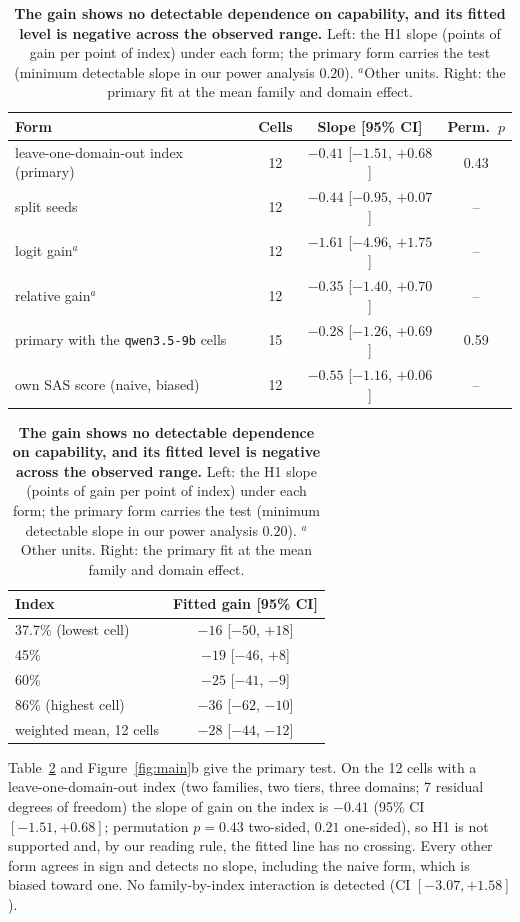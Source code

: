 \begin{table}[t]
\caption{\textbf{The gain shows no detectable dependence on capability, and its fitted level is negative across the observed range.} Left: the H1 slope (points of gain per point of index) under each form; the primary form carries the test (minimum detectable slope in our power analysis $0.20$). $^{a}$Other units. Right: the primary fit at the mean family and domain effect.}
\label{tab:h1}
\begin{center}
\scriptsize
\setlength{\tabcolsep}{4pt}
\begin{minipage}[t]{0.60\linewidth}
\centering
\setlength{\tabcolsep}{3pt}
\begin{tabular}{@{}lccc@{}}
\toprule
Form & Cells & Slope [95\% CI] & Perm.\ $p$ \\
\midrule
leave-one-domain-out index (primary) & 12 & $-0.41$ [$-1.51$, $+0.68$] & 0.43 \\
split seeds & 12 & $-0.44$ [$-0.95$, $+0.07$] & -- \\
logit gain$^{a}$ & 12 & $-1.61$ [$-4.96$, $+1.75$] & -- \\
relative gain$^{a}$ & 12 & $-0.35$ [$-1.40$, $+0.70$] & -- \\
primary with the \texttt{qwen3.5-9b} cells & 15 & $-0.28$ [$-1.26$, $+0.69$] & 0.59 \\
own SAS score (naive, biased) & 12 & $-0.55$ [$-1.16$, $+0.06$] & -- \\
\bottomrule
\end{tabular}
\end{minipage}\hfill
\begin{minipage}[t]{0.37\linewidth}
\centering
\begin{tabular}{@{}lc@{}}
\toprule
Index & Fitted gain [95\% CI] \\
\midrule
37.7\% (lowest cell) & $-16$ [$-50$, $+18$] \\
45\% & $-19$ [$-46$, $+8$] \\
60\% & $-25$ [$-41$, $-9$] \\
86\% (highest cell) & $-36$ [$-62$, $-10$] \\
\midrule
weighted mean, 12 cells & $-28$ [$-44$, $-12$] \\
\bottomrule
\end{tabular}
\end{minipage}
\end{center}
\end{table}

Table~\ref{tab:h1} and Figure~\ref{fig:main}b give the primary test. On the 12 cells with a leave-one-domain-out index (two families, two tiers, three domains; 7 residual degrees of freedom) the slope of gain on the index is $-0.41$ (95\% CI $[-1.51, +0.68]$; permutation $p = 0.43$ two-sided, $0.21$ one-sided), so H1 is not supported and, by our reading rule, the fitted line has no crossing. Every other form agrees in sign and detects no slope, including the naive form, which is biased toward one. No family-by-index interaction is detected (CI $[-3.07, +1.58]$).

